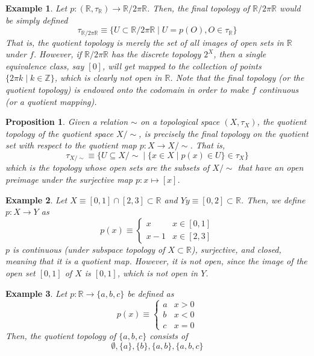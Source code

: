 \documentclass{article}
\newtheorem{proposition}[theorem]{Proposition}
\newtheorem{example}{Example}[section]
\theoremstyle{remark}
\theoremstyle{definition}
\begin{document}
\begin{example}
Let $p: (\mathbb{R}, \tau_\mathbb{R}) \longrightarrow \mathbb{R} / 2 \pi \mathbb{R}$. Then, the final topology of $\mathbb{R} / 2 \pi \mathbb{R}$ would be simply defined 
\[\tau_{\mathbb{R} / 2 \pi \mathbb{R}} \equiv \{U \subset \mathbb{R} / 2\pi \mathbb{R} \; | \; U = p(O), O \in \tau_\mathbb{R}\}\]
That is, the quotient topology is merely the set of all images of open sets in $\mathbb{R}$ under $f$. However, if $\mathbb{R} / 2 \pi \mathbb{R}$ has the discrete topology $2^X$, then a single equivalence class, say $[0]$, will get mapped to the collection of points $\{2 \pi k \; | \; k \in \mathbb{Z}\}$, which is clearly not open in $\mathbb{R}$. Note that the final topology (or the quotient topology) is endowed onto the codomain in order to make $f$ continuous (or a quotient mapping). 
\end{example}

\begin{proposition}
Given a relation $\sim$ on a topological space $(X, \tau_X)$, the quotient topology of the quotient space $X / \sim$, is precisely the final topology on the quotient set with respect to the quotient map $p: X \longrightarrow X / \sim$. That is, 
\[\tau_{X / \sim} \equiv \big\{U \subseteq X / \sim \; | \; \{x \in X \; | \; p(x) \in U\} \in \tau_X \big\}\]
which is the topology whose open sets are the subsets of $X / \sim$ that have an open preimage under the surjective map $p: x \mapsto [x]$. 
\end{proposition}

\begin{example}
Let $X \equiv [0,1] \cap [2,3] \subset \mathbb{R}$ and $Y y \equiv [0,2] \subset \mathbb{R}$. Then, we define $p: X \longrightarrow Y$ as 
\[p(x) \equiv \begin{cases}
      x & x \in [0,1] \\
      x-1 & x \in [2,3]
\end{cases}\]
$p$ is continuous (under subspace topology of $X \subset \mathbb{R}$), surjective, and closed, meaning that it is a quotient map. However, it is not open, since the image of the open set $[0,1]$ of $X$ is $[0,1]$, which is not open in $Y$. 
\end{example}

\begin{example}
Let $p: \mathbb{R} \longrightarrow \{a, b, c\}$ be defined as 
\[p(x) \equiv \begin{cases}
      a & x > 0 \\
      b & x < 0 \\
      c & x = 0
\end{cases}\]
Then, the quotient topology of $\{a, b, c\}$ consists of 
\[\emptyset, \{a\}, \{b\}, \{a, b\}, \{a, b, c\}\]
\end{example}
\end{document}
